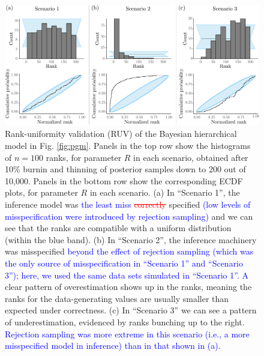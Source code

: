 \documentclass[oneside]{article}
\begin{document}
\begin{figure}
  \centering
  \includegraphics[width=0.95\linewidth]{../figures/sbc_Yule_BM_r_manual.pdf}
  \caption{
    Rank-uniformity validation (RUV) of the Bayesian hierarchical model in Fig. \ref{fig:pgm}.
    Panels in the top row show the histograms of $n=100$ ranks, for parameter $R$ in each scenario, obtained after 10\% burnin and thinning of posterior samples down to 200 out of 10,000.
    Panels in the bottom row show the corresponding ECDF plots, for parameter $R$ in each scenario.
    (a) In ``Scenario 1'', the inference model was \textcolor{blue}{the least miss}\textcolor{red}{\st{ correctly }}specified \textcolor{blue}{(low levels of misspecification were introduced by rejection sampling)} and we can see that the ranks are compatible with a uniform distribution (within the blue band). 
    (b) In ``Scenario 2'', the inference machinery was misspecified \textcolor{blue}{beyond the effect of rejection sampling (which was the only source of misspecification in ``Scenario 1'' and ``Scenario 3''); here, we used the same data sets simulated in ``Scenario 1''. A} clear pattern of overestimation shows up in the ranks, meaning the ranks for the data-generating values are usually smaller than expected under correctness.
    (c) In ``Scenario 3'' we can see a pattern of underestimation, evidenced by ranks bunching up to the right. \textcolor{blue}{Rejection sampling was more extreme in this scenario (i.e., a more misspecified model in inference) than in that shown in (a).}}
  \label{fig:ruv_yule}
\end{figure}

\end{document}
